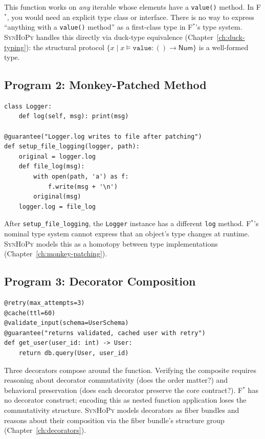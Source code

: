 \documentclass[11pt,a4paper]{report}
\theoremstyle{definition}
\theoremstyle{plain}
\newcommand{\fstar}{F$^{*}$}
\newcommand{\synhopy}{\textsc{SynHoPy}}
\begin{document}
This function works on \emph{any} iterable whose elements have a
\lstinline[style=python]{value()} method.  In \fstar{}, you would need
an explicit type class or interface.  There is no way to express ``anything
with a \lstinline[style=python]{value()} method'' as a first-class type
in \fstar{}'s type system.  \synhopy{} handles this directly via
duck-type equivalence (Chapter~\ref{ch:duck-typing}): the structural
protocol $\{x \mid x \models \mathtt{value} : () \to \mathsf{Num}\}$
is a well-formed type.

\subsection{Program 2: Monkey-Patched Method}

\begin{lstlisting}[style=synhopy]
class Logger:
    def log(self, msg): print(msg)

@guarantee("Logger.log writes to file after patching")
def setup_file_logging(logger, path):
    original = logger.log
    def file_log(msg):
        with open(path, 'a') as f:
            f.write(msg + '\n')
        original(msg)
    logger.log = file_log
\end{lstlisting}

After \lstinline[style=python]{setup_file_logging}, the
\lstinline[style=python]{Logger} instance has a different
\lstinline[style=python]{log} method.  \fstar{}'s nominal type
system cannot express that an object's type changes at runtime.
\synhopy{} models this as a homotopy between type implementations
(Chapter~\ref{ch:monkey-patching}).

\subsection{Program 3: Decorator Composition}

\begin{lstlisting}[style=synhopy]
@retry(max_attempts=3)
@cache(ttl=60)
@validate_input(schema=UserSchema)
@guarantee("returns validated, cached user with retry")
def get_user(user_id: int) -> User:
    return db.query(User, user_id)
\end{lstlisting}

Three decorators compose around the function.  Verifying the composite
requires reasoning about decorator commutativity (does the order
matter?) and behavioral preservation (does each decorator preserve
the core contract?).  \fstar{} has no decorator construct; encoding
this as nested function application loses the commutativity structure.
\synhopy{} models decorators as fiber bundles and reasons about their
composition via the fiber bundle's structure group
(Chapter~\ref{ch:decorators}).
\end{document}
